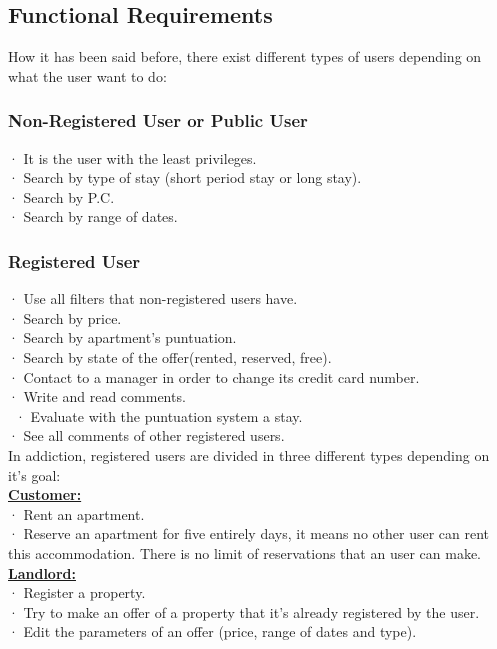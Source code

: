 \documentclass[12pt]{article}
\begin{document}
\subsection{Functional Requirements}{\label{subsec:fr}
How it has been said before, there exist different types of users depending on what the user want to do:
\subsubsection{Non-Registered User or Public User}
· It is the user with the least privileges.\\
· Search by type of stay (short period stay or long stay).\\
· Search by P.C.\\
· Search by range of dates.
\subsubsection{Registered User}
· Use all filters that non-registered users have.\\
· Search by price.\\
· Search by apartment's puntuation.\\
· Search by state of the offer(rented, reserved, free).\\
· Contact to a manager in order to change its credit card number.\\
· Write and read comments.\\\
· Evaluate with the puntuation system a stay.\\
· See all comments of other registered users.\\
In addiction, registered users are divided in three different types depending on it's goal:\\

\textbf{\underline{Customer:}}\\
· Rent an apartment.\\
· Reserve an apartment for five entirely days, it means no other user can rent this accommodation. There is no limit of reservations that an user can make.\\

\textbf{\underline{Landlord:}}\\
· Register a property.\\
· Try to make an offer of a property that it's already registered by the user.\\
· Edit the parameters of an offer (price, range of dates and type).\\

}
\end{document}
